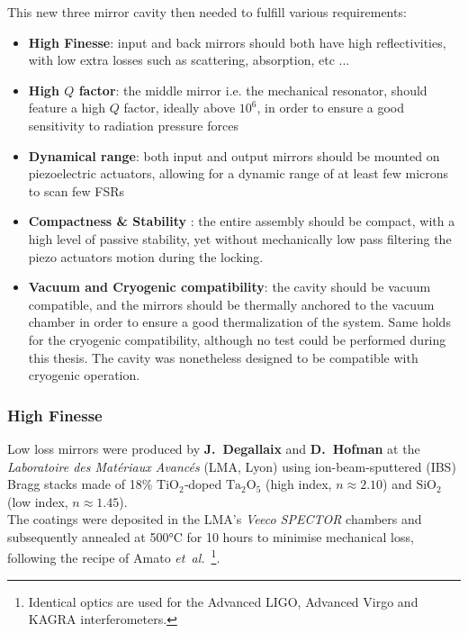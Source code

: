 This new three mirror cavity then needed to fulfill various requirements: 
\begin{itemize}
    \item \textbf{High Finesse}: input and back mirrors should both have high reflectivities, with low extra losses such as scattering, absorption, etc ...\cite{AmatoPhD}
    \item \textbf{High $Q$ factor}: the middle mirror i.e. the mechanical resonator, should feature a high $Q$ factor, ideally above $10^6$, in order to ensure a good sensitivity to radiation pressure forces\cite{SiN_review}
    \item \textbf{Dynamical range}: both input and output mirrors should be mounted on piezoelectric actuators, allowing for a dynamic range of at least few microns to scan few FSRs\cite{piezo_review}
    \item \textbf{Compactness \& Stability }: the entire assembly should be compact, with a high level of passive stability, yet without mechanically low pass filtering the piezo actuators motion during the locking. 
    \item \textbf{Vacuum and Cryogenic compatibility}: the cavity should be vacuum compatible, and the mirrors should be thermally anchored to the vacuum chamber in order to ensure a good thermalization of the system. Same holds for the cryogenic compatibility, although no test could be performed during this thesis. The cavity was nonetheless designed to be compatible with cryogenic operation.
\end{itemize}
\subsubsection{High Finesse}

Low loss mirrors were produced by \textbf{J.~Degallaix} and \textbf{D.~Hofman} at the
\textit{Laboratoire des Matériaux Avancés} (LMA, Lyon) using
ion-beam-sputtered (IBS) Bragg stacks made of 18\% $\mathrm{TiO_2}$‐doped $\mathrm{Ta_2O_5}$ (high index,
$n\!\approx\!2.10$) and $\mathrm{SiO_2}$ (low index, $n\!\approx\!1.45$)\cite{AmatoPhD,LMA_IBS}. \\
The coatings were deposited in the LMA's \textit{Veeco SPECTOR} chambers and subsequently annealed at 500°C for 10 hours to minimise mechanical loss, following the recipe of Amato \textit{et~al.}\,\cite{AmatoPhD}%
\footnote{Identical optics are used for the Advanced LIGO, Advanced Virgo
and KAGRA interferometers\cite{LIGO_optics}.}.\\

